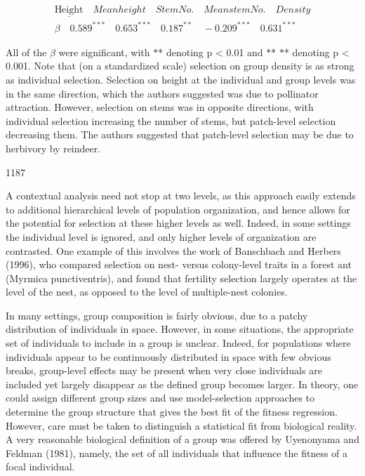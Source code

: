 \documentclass{article}
\begin{document}
\begin{equation}
\begin{array}{l}\underline{\text{Height}}\quad Mean height\quad Stem No.\quad Mean stem No.\quad Density\\\beta\quad0.589^{***}\quad0.653^{***}\quad0.187^{**}\quad-0.209^{***}\quad0.631^{***}\end{array}
\end{equation}

All of the  $ \beta $ were significant, with  $ * $* denoting p < 0.01 and  $ * $* $ * $* denoting p < 0.001. Note that (on a standardized scale) selection on group density is as strong as individual selection. Selection on height at the individual and group levels was in the same direction, which the authors suggested was due to pollinator attraction. However, selection on stems was in opposite directions, with individual selection increasing the number of stems, but patch-level selection decreasing them. The authors suggested that patch-level selection may be due to herbivory by reindeer.

1187

A contextual analysis need not stop at two levels, as this approach easily extends to additional hierarchical levels of population organization, and hence allows for the potential for selection at these higher levels as well. Indeed, in some settings the individual level is ignored, and only higher levels of organization are contrasted. One example of this involves the work of Banschbach and Herbers (1996), who compared selection on nest- versus colony-level traits in a forest ant (Myrmica punctiventris), and found that fertility selection largely operates at the level of the nest, as opposed to the level of multiple-nest colonies.

In many settings, group composition is fairly obvious, due to a patchy distribution of individuals in space. However, in some situations, the appropriate set of individuals to include in a group is unclear. Indeed, for populations where individuals appear to be continuously distributed in space with few obvious breaks, group-level effects may be present when very close individuals are included yet largely disappear as the defined group becomes larger. In theory, one could assign different group sizes and use model-selection approaches to determine the group structure that gives the best fit of the fitness regression. However, care must be taken to distinguish a statistical fit from biological reality. A very reasonable biological definition of a group was offered by Uyenonyama and Feldman (1981), namely, the set of all individuals that influence the fitness of a focal individual.
\end{document}
